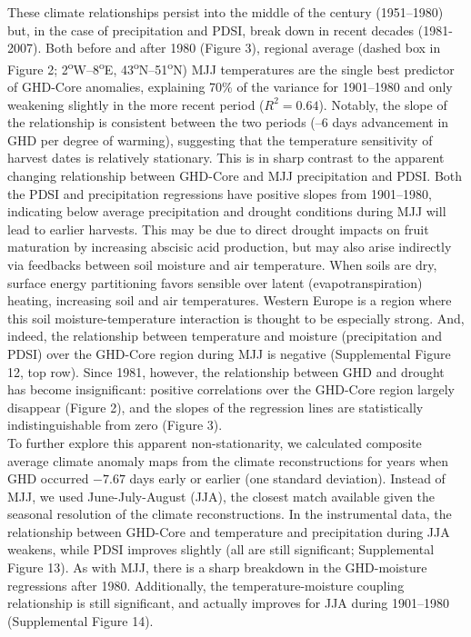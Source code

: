 \documentclass[final]{nature}
\begin{document}
\indent These climate relationships persist into the middle of the century (1951--1980) but, in the case of precipitation and PDSI, break down in recent decades (1981-2007). Both before and after 1980 (Figure 3), regional average (dashed box in Figure 2; 2\textsuperscript{o}W--8\textsuperscript{o}E, 43\textsuperscript{o}N--51\textsuperscript{o}N) MJJ temperatures are the single best predictor of GHD-Core anomalies, explaining 70\% of the variance for 1901--1980 and only weakening slightly in the more recent period ($R^2=0.64$). Notably, the slope of the relationship is consistent between the two periods (--6 days advancement in GHD per degree of warming), suggesting that the temperature sensitivity of harvest dates is relatively stationary. This is in sharp contrast to the apparent changing relationship between GHD-Core and MJJ precipitation and PDSI. Both the PDSI and precipitation regressions have positive slopes from 1901--1980, indicating below average precipitation and drought conditions during MJJ will lead to earlier harvests. This may be due to direct drought impacts on fruit maturation by increasing abscisic acid production\cite{webb2012}, but may also arise indirectly via feedbacks between soil moisture and air temperature. When soils are dry, surface energy partitioning favors sensible over latent (evapotranspiration) heating, increasing soil and air temperatures. Western Europe is a region where this soil moisture-temperature interaction is thought to be especially strong\cite{Seneviratne2006}. And, indeed, the relationship between temperature and moisture (precipitation and PDSI) over the GHD-Core region during MJJ is negative (Supplemental Figure 12, top row). Since 1981, however, the relationship between GHD and drought has become insignificant: positive correlations over the GHD-Core region largely disappear (Figure 2), and the slopes of the regression lines are statistically indistinguishable from zero (Figure 3).\\
\indent To further explore this apparent non-stationarity, we calculated composite average climate anomaly maps from the climate reconstructions for years when GHD occurred $-7.67$ days early or earlier (one standard deviation). Instead of MJJ, we used June-July-August (JJA), the closest match available given the seasonal resolution of the climate reconstructions. In the instrumental data, the relationship between GHD-Core and temperature and precipitation during JJA weakens, while PDSI improves slightly (all are still significant; Supplemental Figure 13). As with MJJ, there is a sharp breakdown in the GHD-moisture regressions after 1980. Additionally, the temperature-moisture coupling relationship is still significant, and actually improves for JJA during 1901--1980 (Supplemental Figure 14).\\
\end{document}
